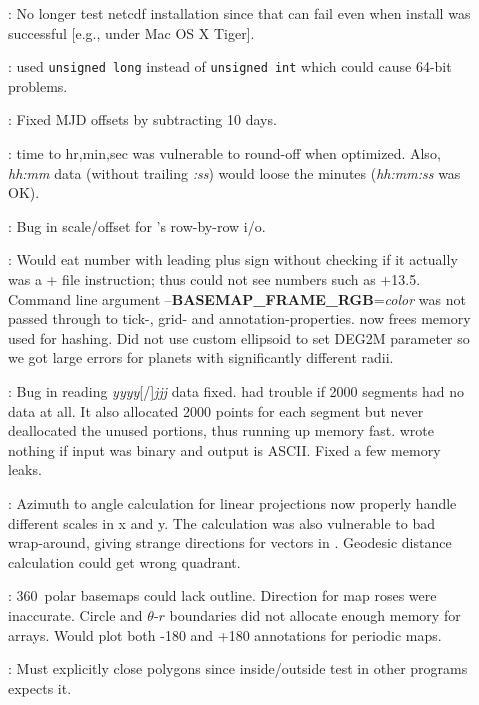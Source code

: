 \begin{description}
\item []: No longer test netcdf installation since that can fail even when install was
successful [e.g., under Mac OS X Tiger].
\item []:  used {\tt unsigned long} instead of {\tt unsigned int} which could cause
64-bit problems.
\item []: Fixed MJD offsets by subtracting 10 days.
\item []: time to hr,min,sec was vulnerable to round-off when optimized.  Also, {\it hh:mm} data
(without trailing {\it :ss}) would loose the minutes ({\it hh:mm:ss} was OK).
\item []: Bug in scale/offset for 's row-by-row i/o.
\item []: Would eat number with leading plus sign without checking if it actually was
a + file instruction; thus  could not see numbers such as +13.5.
Command line argument --{\bf BASEMAP\_FRAME\_RGB}={\it color} was not passed through to tick-, grid- and
annotation-properties.   now frees memory used for hashing.  Did not use custom ellipsoid to set
DEG2M parameter so we got large errors for planets with significantly different radii.
\item []: Bug in reading {\it yyyy}[/]{\it jjj} data fixed.  
had trouble if 2000 segments had no data at all.  It also allocated 2000 points for each segment but never
deallocated the unused portions, thus running up memory fast.   wrote nothing
if input was binary and output is ASCII.  Fixed a few memory leaks.
\item []: Azimuth to angle calculation for linear projections now properly handle different
scales in x and y. The calculation was also vulnerable to bad wrap-around, giving strange directions for
vectors in . Geodesic distance calculation could get wrong quadrant.  
\item []: 360\DS\ polar basemaps could lack outline.  Direction for map roses were inaccurate.
Circle and $\theta$-$r$ boundaries did not allocate enough memory for arrays.  Would plot both -180 and +180 annotations
for periodic maps.
\item []: Must explicitly close polygons since inside/outside test in other programs expects it.

\end{description}
